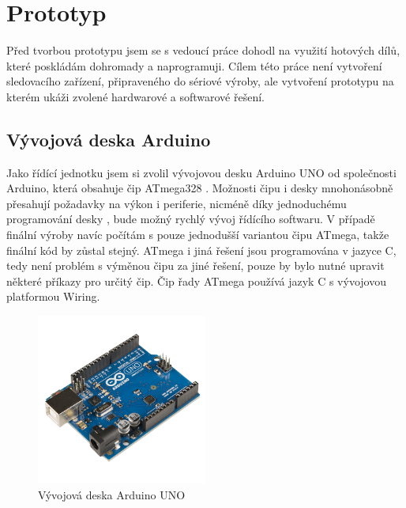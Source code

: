 \documentclass[FM,BP]{tulthesis}  %
\begin{document}

\chapter{Prototyp}
Před tvorbou prototypu jsem se s vedoucí práce dohodl na využití hotových dílů, které poskládám dohromady a naprogramuji. Cílem této práce není vytvoření sledovacího zařízení, připraveného do sériové výroby, ale vytvoření prototypu na kterém ukáži zvolené hardwarové a softwarové řešení.

\section{Vývojová deska Arduino}
Jako řídící jednotku jsem si zvolil vývojovou desku Arduino UNO \cite{Arduino schematic} od společnosti Arduino, která obsahuje čip ATmega328 \cite{Atmega datasheet}. Možnosti čipu i desky mnohonásobně přesahují požadavky na výkon i periferie, nicméně díky jednoduchému programování desky \cite{Pruvodce arduinem}, bude možný rychlý vývoj řídícího softwaru. V případě finální výroby navíc počítám s pouze jednodušší variantou čipu ATmega, takže finální kód by zůstal stejný. ATmega i jiná řešení jsou programována v jazyce C, tedy není problém s výměnou čipu za jiné řešení, pouze by bylo nutné upravit některé příkazy pro určitý čip. Čip řady ATmega používá jazyk C s vývojovou platformou Wiring.

\begin{figure}[H]
\begin{center}
\includegraphics[width=0.5\textwidth]{images/arduino.png}
\caption{Vývojová deska Arduino UNO}
\label{image}
\end{center}
\end{figure}
\end{document}
